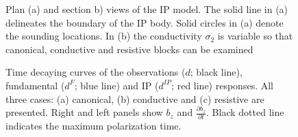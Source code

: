 \documentclass[extra,mreferee]{gji}
\newcommand{\dip}{d^{IP}}
\begin{document}
\begin{figure}
  \caption{Plan (a) and section b) views of the IP model. The solid line in (a) delineates the boundary of the IP body. Solid circles in (a) denote the sounding locations. In (b) the conductivity $\sigma_2$ is variable so that  canonical, conductive and resistive blocks can be examined}
  \label{F: IPModel}
\end{figure}

\begin{figure}
  \caption{Time decaying curves of the observations  ($d$; black line), fundamental ($d^F$; blue line) and IP ($\dip$; red line) responses. All three cases: (a) canonical, (b) conductive and (c) resistive are presented. Right and left panels show $b_z$ and $\frac{\partial b_z}{\partial t}$. Black dotted line indicates the maximum polarization time.}
  \label{F:Three_IPresp}
\end{figure}
\end{document}
